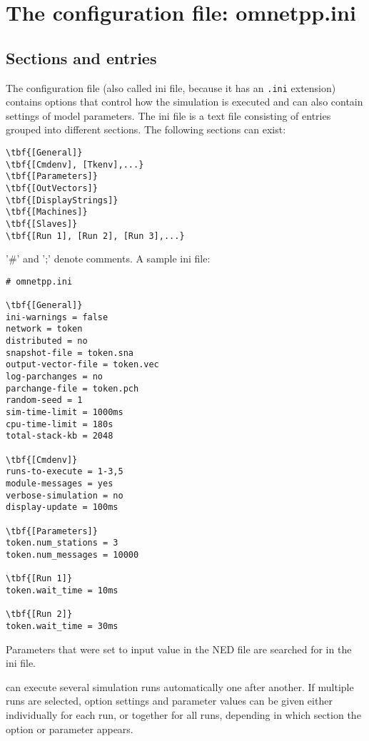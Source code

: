 \section{The configuration file: omnetpp.ini}

\subsection{Sections and entries}

The configuration file (also called ini file, because
it has an \texttt{.ini} extension) contains options that control how
the simulation is executed and can also contain settings of model
parameters.  The ini file is a text file consisting of entries grouped
into different sections. The following sections can exist:

\begin{Verbatim}[commandchars=\\\{\}]
\tbf{[General]}
\tbf{[Cmdenv], [Tkenv],...}
\tbf{[Parameters]}
\tbf{[OutVectors]}
\tbf{[DisplayStrings]}
\tbf{[Machines]}
\tbf{[Slaves]}
\tbf{[Run 1], [Run 2], [Run 3],...}
\end{Verbatim}

'\#' and ';' denote comments. A sample ini file:

\begin{Verbatim}[commandchars=\\\{\}]
# omnetpp.ini

\tbf{[General]}
ini-warnings = false
network = token
distributed = no
snapshot-file = token.sna
output-vector-file = token.vec
log-parchanges = no
parchange-file = token.pch
random-seed = 1
sim-time-limit = 1000ms
cpu-time-limit = 180s
total-stack-kb = 2048

\tbf{[Cmdenv]}
runs-to-execute = 1-3,5
module-messages = yes
verbose-simulation = no
display-update = 100ms

\tbf{[Parameters]}
token.num_stations = 3
token.num_messages = 10000

\tbf{[Run 1]}
token.wait_time = 10ms

\tbf{[Run 2]}
token.wait_time = 30ms
\end{Verbatim}


Parameters that were set to input value in the
NED file are searched for in the ini file.

{\opp} can execute several simulation runs automatically one after
another. If multiple runs are
selected, option settings and parameter values can be given either
individually for each run, or together for all runs, depending in
which section the option or parameter appears.



